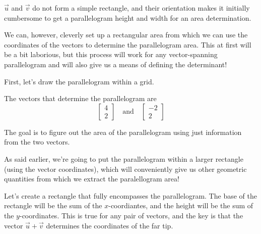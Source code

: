 \documentclass{ximera}
\begin{document}
    $\vec{u}$ and $\vec{v}$ do not form a simple rectangle, and their orientation makes it initially cumbersome to get a parallelogram height and width for an area determination. 

    We can, however, cleverly set up a rectangular area from which we can use the coordinates of the vectors to determine the parallelogram area. This at first will be a bit laborious, but this process will work for any vector-spanning parallelogram and will also give us a means of defining the determinant!

    \begin{example}\label{ex:areaofparallelogram}
      First, let's draw the parallelogram within a grid.

      \begin{center}
      \end{center}

      \begin{explanation}

      The vectors that determine the parallelogram are
      $$\begin{bmatrix}4\\2\end{bmatrix}\quad\text{and}\quad\begin{bmatrix}-2\\2\end{bmatrix}$$

      The goal is to figure out the area of the parallelogram using just information from the two vectors. 

      As said earlier, we're going to put the parallelogram within a larger rectangle (using the vector coordinates), which will conveniently give us other geometric quantities from which we extract the paralellogram area!

      Let's create a rectangle that fully encompasses the parallelogram. The base of the rectangle will be the sum of the $x$-coordiantes, and the height will be the sum of the $y$-coordinates. This is true for any pair of vectors, and the key is that the vector $\vec{u}+\vec{v}$ determines the coordinates of the far tip. 


\end{explanation}
\end{example}
\end{document}
